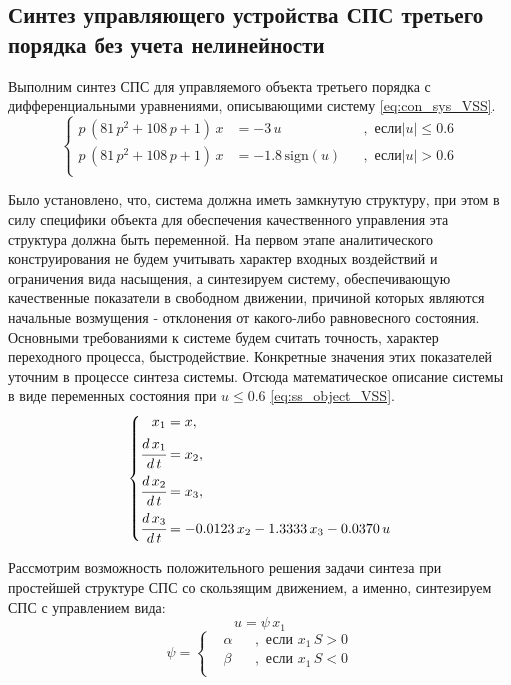 \subsection{Синтез управляющего устройства СПС третьего порядка без учета нелинейности}
Выполним синтез СПС для  управляемого объекта третьего порядка с дифференциальными уравнениями, описывающими систему  \eqref{eq:con_sys_VSS}.
\begin{equation}
    \left\{
    \begin{aligned} \label{eq:con_sys_VSS}
       p\,\left(81\,p^2+108\,p+1\right)\,x&=-3\,u&&, \text{ если}|u|\le 0.6\\
       p\,\left(81\,p^2+108\,p+1\right)\,x&=-1.8\,\mathrm{sign}\left(u\right)&&, \text{ если}|u|> 0.6\\
    \end{aligned}
    \right.
\end{equation}

Было установлено, что, система должна иметь замкнутую структуру, при этом в силу специфики объекта для обеспечения качественного управления эта структура должна быть переменной. На первом этапе аналитического конструирования не будем учитывать характер входных воздействий и ограничения вида насыщения, а синтезируем систему, обеспечивающую качественные показатели в свободном движении, причиной которых являются начальные возмущения - отклонения от какого-либо равновесного состояния. Основными требованиями к системе будем считать точность, характер переходного процесса, быстродействие. Конкретные значения этих показателей уточним в процессе синтеза системы.
Отсюда математическое описание системы в виде переменных состояния при $u\le0.6$ \eqref{eq:ss_object_VSS}.
\begin{equation}\label{eq:ss_object_VSS}    \left\{    \begin{aligned}x_1&=x , \\ \cfrac{d\,x_1}{d\,t}&=x_2 ,\\ \cfrac{d\,x_2}{d\,t}&=x_3,\\\cfrac{d\,x_3}{d\,t}&=-
0.0123
\,x_2-
1.3333
\,x_3-
0.0370
\,u    \end{aligned}    \right.\end{equation}

     Рассмотрим возможность положительного решения задачи синтеза при простейшей структуре СПС со скользящим движением, а именно, синтезируем СПС с управлением вида:
\begin{equation} \label{eq:}
u=\psi\,x_1
\end{equation}
\begin{equation}\label{eq:}
\psi=
    \left\{
    \begin{aligned}
&\alpha &&,\text{ если } x_1\,S>0 \\
&\beta &&,\text{ если } x_1\,S<0 \\
    \end{aligned}
    \right.
\end{equation}

